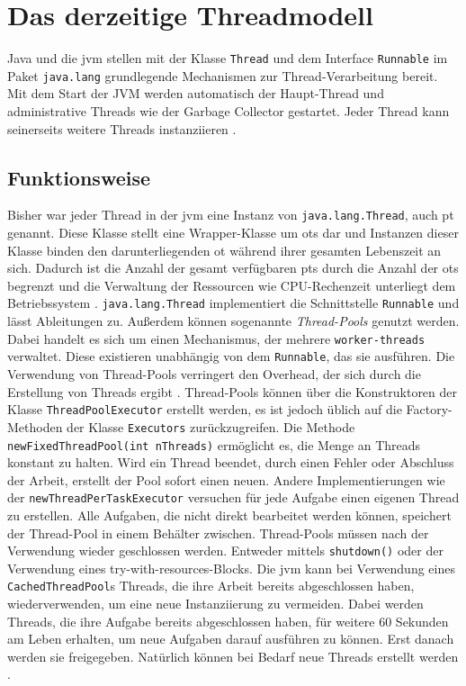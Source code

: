 \chapter{Das derzeitige Threadmodell}
\label{cha:DasDerzeitigeThreadmodell}                   %
    Java und die \gls{jvm} stellen mit der Klasse \texttt{Thread} und dem Interface \texttt{Runnable} im Paket \texttt{java.lang} grundlegende Mechanismen zur Thread-Verarbei\-tung bereit.
    Mit dem Start der JVM werden automatisch der Haupt-Thread und administrative Threads wie der Garbage Collector gestartet. Jeder Thread kann seinerseits weitere Threads instanziieren \cite{GrundKursBS}.
  
\section{Funktionsweise}                                         
\label{sec:Funktionsweise}

    Bisher war jeder Thread in der \gls{jvm} eine Instanz von \texttt{java.lang.Thread}, auch \gls{pt} genannt. Diese Klasse stellt eine Wrapper-Klasse um \Glspl{ot} dar und Instanzen dieser Klasse
    binden den darunterliegenden \gls{ot}  während ihrer gesamten Lebenszeit an sich. Dadurch ist die Anzahl der gesamt verfügbaren \Glspl{pt} durch die Anzahl der \Glspl{ot} begrenzt und die Verwaltung
    der Ressourcen wie CPU-Rechenzeit unterliegt dem Betriebssystem \cite{JEP425}.
    \texttt{java.lang.Thread} implementiert die Schnittstelle \texttt{Runnable} und lässt Ableitungen zu.
    Außerdem können sogenannte \emph{Thread-Pools} genutzt werden. Dabei handelt es sich um einen Mechanismus, der mehrere \texttt{worker-threads} verwaltet. Diese existieren unabhängig von dem \texttt{Runnable},
    das sie ausführen. Die Verwendung von Thread-Pools verringert den Overhead, der sich durch die Erstellung von Threads ergibt \cite{ThreadPool}. Thread-Pools können über die Konstruktoren der Klasse 
    \texttt{ThreadPoolExecutor}
    erstellt werden, es ist jedoch üblich auf die Factory-Methoden der Klasse \texttt{Executors} zurückzugreifen. Die Methode \texttt{newFixedThreadPool(int nThreads)} ermöglicht es, 
    die Menge an Threads konstant zu halten. Wird ein Thread beendet, durch einen Fehler oder Abschluss der Arbeit, erstellt der Pool sofort einen neuen. Andere Implementierungen wie der 
    \texttt{newThread\-PerTaskExecutor} versuchen für jede Aufgabe einen eigenen Thread zu erstellen. Alle Aufgaben, die nicht direkt bearbeitet werden können, 
    speichert der Thread-Pool in einem Behälter zwischen. Thread-Pools müssen nach der Verwendung wieder geschlossen werden. Entweder mittels \texttt{shutdown()} oder der Verwendung eines
    try-with-resources-Blocks.
    Die \gls{jvm} kann bei Verwendung eines \texttt{CachedThreadPool}s Threads, die ihre Arbeit bereits 
    abgeschlossen haben, wiederverwenden, um eine neue Instanziierung zu vermeiden. Dabei werden Threads, die ihre Aufgabe bereits abgeschlossen haben, für weitere 60 Sekunden am Leben erhalten, um 
    neue Aufgaben darauf ausführen zu können. Erst danach werden sie freigegeben. Natürlich können bei Bedarf neue Threads erstellt werden \cite{Executors}.

